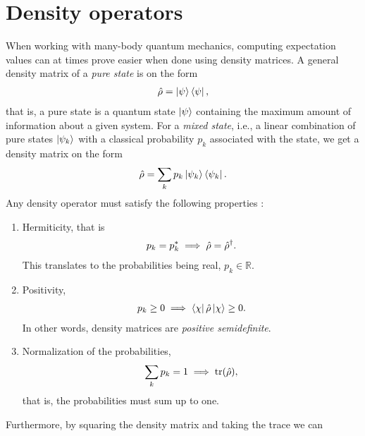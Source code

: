     \section{Density operators}
        \label{sec:density-operators}
        When working with many-body quantum mechanics, computing expectation
        values can at times prove easier when done using density matrices. A
        general density matrix of a \emph{pure state} is on the form
        \begin{align}
            \hat{\rho} = \ket{\psi}\bra{\psi},
        \end{align}
        that is, a pure state is a quantum state $\ket{\psi}$ containing the
        maximum amount of information about a given system. For a \emph{mixed
        state}, i.e., a linear combination of pure states $\ket{\psi_k}$ with a
        classical probability $p_k$ associated with the state, we get a density
        matrix on the form
        \begin{align}
            \hat{\rho} = \sum_{k} p_k \ket{\psi_k}\bra{\psi_k}.
        \end{align}
        Any density operator must satisfy the following
        properties \cite{modern-qm}:
        \begin{enumerate}
            \item Hermiticity, that is
                \begin{align}
                    p_k = p_k^{*} \implies \hat{\rho} = \hat{\rho}^{\dagger}.
                \end{align}
                This translates to the probabilities being real, $p_k \in
                \mathbb{R}$.
            \item Positivity,
                \begin{align}
                    p_k \geq 0 \implies \bra{\chi}\hat{\rho}\ket{\chi} \geq 0.
                \end{align}
                In other words, density matrices are \emph{positive
                semidefinite}.
            \item Normalization of the probabilities,
                \begin{align}
                    \sum_{k} p_k = 1 \implies \tr(\hat{\rho}),
                \end{align}
                that is, the probabilities must sum up to one.
        \end{enumerate}
        Furthermore, by squaring the density matrix and taking the trace we can

